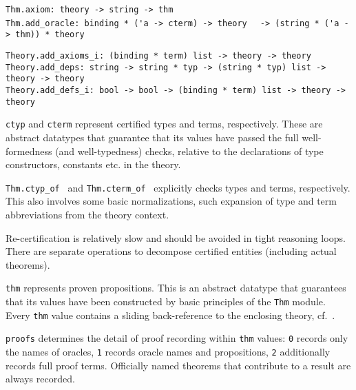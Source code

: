 \begin{isabellebody}
\begin{isamarkuptext}
\begin{mldecls}
  \verb|Thm.axiom: theory -> string -> thm| \\
  \verb|Thm.add_oracle: binding * ('a -> cterm) -> theory|\isasep\isanewline%
\verb|  -> (string * ('a -> thm)) * theory| \\
  \end{mldecls}
  \begin{mldecls}
  \verb|Theory.add_axioms_i: (binding * term) list -> theory -> theory| \\
  \verb|Theory.add_deps: string -> string * typ -> (string * typ) list -> theory -> theory| \\
  \verb|Theory.add_defs_i: bool -> bool -> (binding * term) list -> theory -> theory| \\
  \end{mldecls}

  \begin{description}

  \item \verb|ctyp| and \verb|cterm| represent certified types
  and terms, respectively.  These are abstract datatypes that
  guarantee that its values have passed the full well-formedness (and
  well-typedness) checks, relative to the declarations of type
  constructors, constants etc. in the theory.

  \item \verb|Thm.ctyp_of|~ and \verb|Thm.cterm_of|~ explicitly checks types and terms,
  respectively.  This also involves some basic normalizations, such
  expansion of type and term abbreviations from the theory context.

  Re-certification is relatively slow and should be avoided in tight
  reasoning loops.  There are separate operations to decompose
  certified entities (including actual theorems).

  \item \verb|thm| represents proven propositions.  This is an
  abstract datatype that guarantees that its values have been
  constructed by basic principles of the \verb|Thm| module.
  Every \verb|thm| value contains a sliding back-reference to the
  enclosing theory, cf.\ .

  \item \verb|proofs| determines the detail of proof recording within
  \verb|thm| values: \verb|0| records only the names of oracles,
  \verb|1| records oracle names and propositions, \verb|2| additionally
  records full proof terms.  Officially named theorems that contribute
  to a result are always recorded.


\end{description}
\end{isamarkuptext}
\end{isabellebody}
